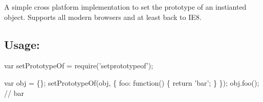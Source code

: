 A simple cross platform implementation to set the prototype of an instianted object. Supports all modern browsers and at least back to I\+E8.

\subsection*{Usage\+:}





\begin{DoxyCode}
var setPrototypeOf = require('setprototypeof');

var obj = \{\};
setPrototypeOf(obj, \{
    foo: function() \{
        return 'bar';
    \}
\});
obj.foo(); // bar
\end{DoxyCode}
 